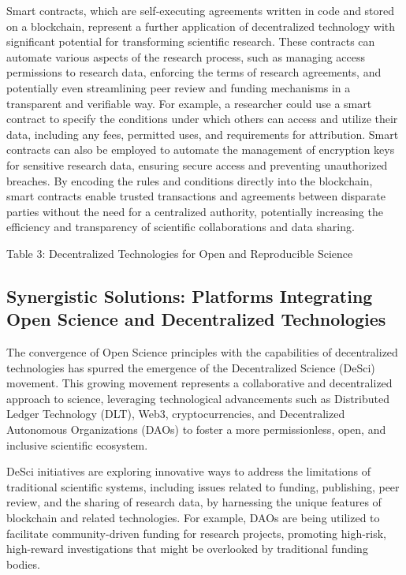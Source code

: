 \documentclass{article}
\begin{document}
Smart contracts, which are self-executing agreements written in code and stored on a blockchain, represent a further application of decentralized technology with significant potential for transforming scientific research. These contracts can automate various aspects of the research process, such as managing access permissions to research data, enforcing the terms of research agreements, and potentially even streamlining peer review and funding mechanisms in a transparent and verifiable way. For example, a researcher could use a smart contract to specify the conditions under which others can access and utilize their data, including any fees, permitted uses, and requirements for attribution. Smart contracts can also be employed to automate the management of encryption keys for sensitive research data, ensuring secure access and preventing unauthorized breaches. By encoding the rules and conditions directly into the blockchain, smart contracts enable trusted transactions and agreements between disparate parties without the need for a centralized authority, potentially increasing the efficiency and transparency of scientific collaborations and data sharing.

Table 3: Decentralized Technologies for Open and Reproducible Science

\subsection{Synergistic Solutions: Platforms Integrating Open Science and Decentralized Technologies}

The convergence of Open Science principles with the capabilities of decentralized technologies has spurred the emergence of the Decentralized Science (DeSci) movement. This growing movement represents a collaborative and decentralized approach to science, leveraging technological advancements such as Distributed Ledger Technology (DLT), Web3, cryptocurrencies, and Decentralized Autonomous Organizations (DAOs) to foster a more permissionless, open, and inclusive scientific ecosystem.

DeSci initiatives are exploring innovative ways to address the limitations of traditional scientific systems, including issues related to funding, publishing, peer review, and the sharing of research data, by harnessing the unique features of blockchain and related technologies. For example, DAOs are being utilized to facilitate community-driven funding for research projects, promoting high-risk, high-reward investigations that might be overlooked by traditional funding bodies.
\end{document}
